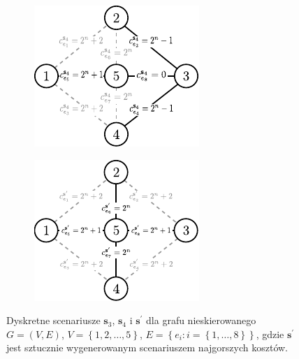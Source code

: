 \begin{figure}[!htbp]
\begin{subfigure}[b]{0.3\textwidth}
		\includegraphics[width=\textwidth]{Chapter_II/MIN-MAX-REG2-example/b}
		\caption{}
		\label{fig:minmaxregexample2:b}
	\end{subfigure}
	\hfill
	\begin{subfigure}[b]{0.3\textwidth}
		\includegraphics[width=\textwidth]{Chapter_II/MIN-MAX-REG2-example/c}
		\caption{}
		\label{fig:minmaxregexample2:c}
	\end{subfigure}
	\hfill\null
	\caption{
		Dyskretne scenariusze $\textbf{s}_{3}$, $\textbf{s}_{4}$ i $\textbf{s}^{\prime}$ dla grafu nieskierowanego $G = \left( V, E \right)$, $V = \left\{ 1, 2, \dots, 5 \right\}$, $E = \left\{ e_{i} : i = \left\{ 1, \dots, 8 \right\} \right\}$, gdzie $\textbf{s}^{\prime}$ jest sztucznie wygenerowanym scenariuszem najgorszych kosztów.
}
\end{figure}
